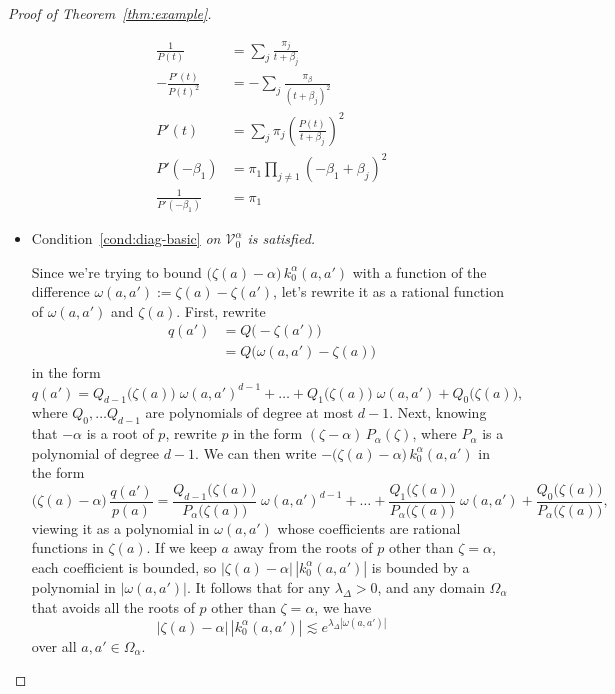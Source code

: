 \documentclass{article}
\theoremstyle{definition}
\theoremstyle{plain}
\newcommand{\hardpart}{\mathcal{V}_0}
\newcommand{\hardker}{k_0}
\newcommand{\domain}{\Omega}
\newenvironment{verify}{\color{ForestGreen}}{\color{black}}
\begin{document}
\begin{proof}[Proof of Theorem~\ref{thm:example}]
\begin{itemize}
\begin{verify}
\begin{align*}
\frac{1}{P(t)} & = \sum_{j} \frac{\pi_j}{t + \beta_j}\\
-\frac{P'(t)}{P(t)^2} &= -\sum_{j} \frac{\pi_\beta}{(t + \beta_j)^2}\\
P'(t) &= \sum_{j} \pi_j \left(\frac{P(t)}{t + \beta_j}\right)^2\\
P'(-\beta_1) &=  \pi_1 \prod_{j\neq 1} (-\beta_1+\beta_j)^2\\
\frac{1}{P'(-\beta_1)} &= \pi_1
\end{align*}
\end{verify}
\item Condition~\eqref{cond:diag-basic} {\em on $\hardpart^\alpha$ is satisfied.}

Since we're trying to bound $\big(\zeta(a) - \alpha\big)\,\hardker^\alpha(a, a')$ with a function of the difference $\omega(a, a') := \zeta(a) - \zeta(a')$, let's rewrite it as a rational function of $\omega(a, a')$ and $\zeta(a)$. First, rewrite
\begin{align*}
q(a') & = Q\big(-\zeta(a')\big) \\
& = Q\big(\omega(a, a') - \zeta(a)\big)
\end{align*}
in the form
\[ q(a') = Q_{d-1}\big(\zeta(a)\big)\;\omega(a, a')^{d-1} + \ldots + Q_1\big(\zeta(a)\big)\;\omega(a, a') + Q_0\big(\zeta(a)\big), \]
where $Q_0, \ldots Q_{d-1}$ are polynomials of degree at most $d-1$. Next, knowing that $-\alpha$ is a root of $p$, rewrite $p$ in the form $(\zeta - \alpha)\,P_\alpha(\zeta)$, where $P_\alpha$ is a polynomial of degree $d-1$. We can then write $-\big(\zeta(a) - \alpha\big)\,\hardker^\alpha(a, a')$ in the form
\[ \big(\zeta(a)-\alpha\big)\,\frac{q(a')}{p(a)} = \frac{Q_{d-1}\big(\zeta(a)\big)}{P_\alpha\big(\zeta(a)\big)}\;\omega(a, a')^{d-1} + \ldots + \frac{Q_1\big(\zeta(a)\big)}{P_\alpha\big(\zeta(a)\big)}\;\omega(a, a') + \frac{Q_0\big(\zeta(a)\big)}{P_\alpha\big(\zeta(a)\big)}, \]
viewing it as a polynomial in $\omega(a, a')$ whose coefficients are rational functions in $\zeta(a)$. If we keep $a$ away from the roots of $p$ other than $\zeta = \alpha$, each coefficient is bounded, so $|\zeta(a) - \alpha|\,|\hardker^\alpha(a, a')|$ is bounded by a polynomial in $|\omega(a, a')|$. It follows that for any $\lambda_\Delta > 0$, and any domain $\domain_\alpha$ that avoids all the roots of $p$ other than $\zeta = \alpha$, we have
\[ |\zeta(a)-\alpha|\,|\hardker^\alpha(a, a')| \lesssim e^{\lambda_\Delta|\omega(a, a')|} \]
over all $a, a' \in \domain_\alpha$.


\end{itemize}
\end{proof}
\end{document}
